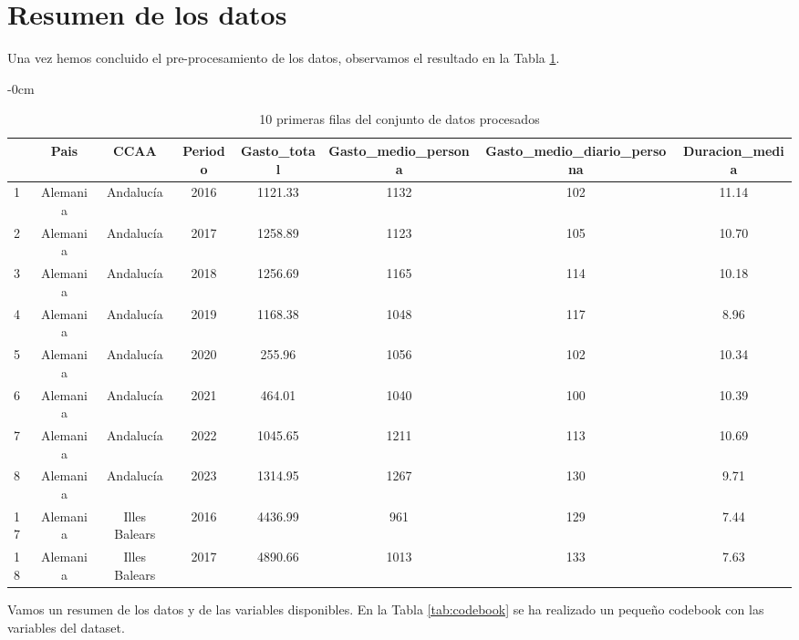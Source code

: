 \documentclass[data,article,submit,moreauthors,pdftex]{Definitions/mdpi}
\begin{document}
\section{Resumen de los datos}\label{resumen-de-los-datos}

Una vez hemos concluido el pre-procesamiento de los datos, observamos el
resultado en la Tabla \ref{tab:unnamed-chunk-27}.

\begin{table}[H]

\caption{\label{tab:unnamed-chunk-27} 10 primeras filas del conjunto de datos procesados}
             \begin{adjustwidth}{-\extralength}{0cm}
             \small
\begin{tabular}[t]{lccccccc}
\toprule
  & Pais & CCAA & Periodo & Gasto\_total & Gasto\_medio\_persona & Gasto\_medio\_diario\_persona & Duracion\_media\\
\midrule
1 & Alemania & Andalucía & 2016 & 1121.33 & 1132 & 102 & 11.14\\
2 & Alemania & Andalucía & 2017 & 1258.89 & 1123 & 105 & 10.70\\
3 & Alemania & Andalucía & 2018 & 1256.69 & 1165 & 114 & 10.18\\
4 & Alemania & Andalucía & 2019 & 1168.38 & 1048 & 117 & 8.96\\
5 & Alemania & Andalucía & 2020 & 255.96 & 1056 & 102 & 10.34\\
6 & Alemania & Andalucía & 2021 & 464.01 & 1040 & 100 & 10.39\\
7 & Alemania & Andalucía & 2022 & 1045.65 & 1211 & 113 & 10.69\\
8 & Alemania & Andalucía & 2023 & 1314.95 & 1267 & 130 & 9.71\\
17 & Alemania & Illes Balears & 2016 & 4436.99 & 961 & 129 & 7.44\\
18 & Alemania & Illes Balears & 2017 & 4890.66 & 1013 & 133 & 7.63\\
\bottomrule
\end{tabular}
    \end{adjustwidth}
\end{table}

Vamos un resumen de los datos y de las variables disponibles. En la
Tabla \ref{tab:codebook} se ha realizado un pequeño codebook con las
variables del dataset.
\end{document}
